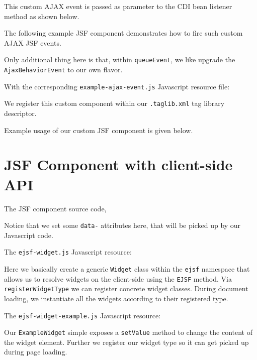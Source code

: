 This custom AJAX event is passed as parameter to the CDI bean listener method as shown below.


The following example JSF component demonstrates how to fire such custom AJAX JSF events.

Only additional thing here is that, within \texttt{queueEvent}, we like upgrade the \texttt{AjaxBehaviorEvent} to our own flavor.

With the corresponding \texttt{example-ajax-event.js} Javascript resource file:


We register this custom component within our \texttt{.taglib.xml} tag library descriptor.


Example usage of our custom JSF component is given below.


\section{JSF Component with client-side API}
The JSF component source code,

Notice that we set some \texttt{data-} attributes here, that will be picked up by our Javascript code.

The \texttt{ejsf-widget.js} Javascript resource:

Here we basically create a generic \texttt{Widget} class within the \texttt{ejsf} namespace that allows us to resolve widgets on the client-side using the \texttt{EJSF} method.
Via \texttt{registerWidgetType} we can register concrete widget classes.
During document loading, we instantiate all the widgets according to their registered type.

The \texttt{ejsf-widget-example.js} Javascript resource:

Our \texttt{ExampleWidget} simple exposes a \texttt{setValue} method to change the content of the widget element.
Further we register our widget type so it can get picked up during page loading.


